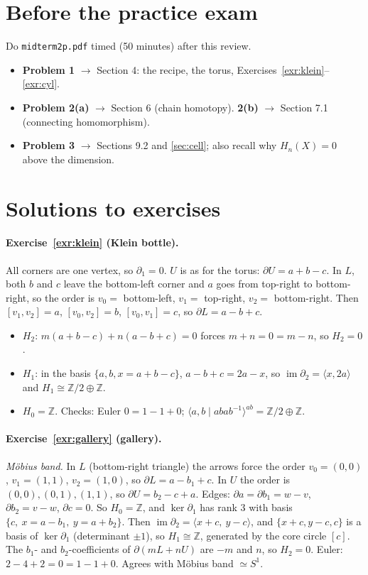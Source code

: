 \documentclass[11pt]{article}
\newcommand{\Z}{\mathbb Z}
\newcommand{\im}{\operatorname{im}}
\theoremstyle{definition}
\begin{document}
\section{Before the practice exam}\label{sec:practice}
Do \texttt{midterm2p.pdf} timed (50 minutes) after this review.
\begin{itemize}
\item \textbf{Problem 1} $\to$ Section 4: the recipe, the torus, Exercises~\ref{exr:klein}--\ref{exr:cyl}.
\item \textbf{Problem 2(a)} $\to$ Section 6 (chain homotopy). \textbf{2(b)} $\to$ Section 7.1 (connecting homomorphism).
\item \textbf{Problem 3} $\to$ Sections 9.2 and \ref{sec:cell}; also recall why $H_n(X)=0$ above the dimension.
\end{itemize}

\appendix
\section{Solutions to exercises}

\paragraph{Exercise~\ref{exr:klein} (Klein bottle).}
All corners are one vertex, so $\partial_1=0$. $U$ is as for the torus: $\partial U=a+b-c$. In $L$, both $b$ and $c$ leave the bottom-left corner and $a$ goes from top-right to bottom-right, so the order is $v_0=$ bottom-left, $v_1=$ top-right, $v_2=$ bottom-right. Then $[v_1,v_2]=a$, $[v_0,v_2]=b$, $[v_0,v_1]=c$, so $\partial L=a-b+c$.
\begin{itemize}
\item $H_2$: $m(a+b-c)+n(a-b+c)=0$ forces $m+n=0=m-n$, so $H_2=0$.
\item $H_1$: in the basis $\{a,b,x=a+b-c\}$, $a-b+c=2a-x$, so $\im\partial_2=\langle x,2a\rangle$ and $H_1\cong\Z/2\oplus\Z$.
\item $H_0=\Z$. Checks: Euler $0=1-1+0$; $\langle a,b\mid abab^{-1}\rangle^{ab}=\Z/2\oplus\Z$.
\end{itemize}

\paragraph{Exercise~\ref{exr:gallery} (gallery).}
\emph{Möbius band.} In $L$ (bottom-right triangle) the arrows force the order $v_0=(0,0)$, $v_1=(1,1)$, $v_2=(1,0)$, so $\partial L=a-b_1+c$. In $U$ the order is $(0,0),(0,1),(1,1)$, so $\partial U=b_2-c+a$. Edges: $\partial a=\partial b_1=w-v$, $\partial b_2=v-w$, $\partial c=0$. So $H_0=\Z$, and $\ker\partial_1$ has rank $3$ with basis $\{c,\ x=a-b_1,\ y=a+b_2\}$. Then $\im\partial_2=\langle x+c,\ y-c\rangle$, and $\{x+c,y-c,c\}$ is a basis of $\ker\partial_1$ (determinant $\pm1$), so $H_1\cong\Z$, generated by the core circle $[c]$. The $b_1$- and $b_2$-coefficients of $\partial(mL+nU)$ are $-m$ and $n$, so $H_2=0$. Euler: $2-4+2=0=1-1+0$. Agrees with Möbius band $\simeq S^1$.
\end{document}
